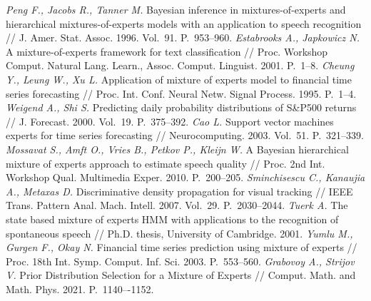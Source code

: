 \documentclass[12pt]{a&t}
\begin{document}
\begin{thebibliography}{}
	\textit{Peng F., Jacobs R., Tanner M.} Bayesian inference in mixtures-of-experts and hierarchical mixtures-of-experts models with an application to speech recognition // J. Amer. Stat. Assoc. 1996. Vol.~91. P.~953--960.
	\textit{Estabrooks A., Japkowicz N.} A mixture-of-experts framework for text classification // Proc. Workshop Comput. Natural Lang. Learn., Assoc. Comput. Linguist. 2001. P.~1--8.
	\textit{Cheung Y., Leung W., Xu L.} Application of mixture of experts model to financial time series forecasting // Proc. Int. Conf. Neural Netw. Signal Process. 1995. P.~1--4.
	\textit{Weigend A., Shi S.} Predicting daily probability distributions of S\&P500 returns // J. Forecast. 2000. Vol.~19. P.~375--392.
	\textit{Cao L.} Support vector machines experts for time series forecasting // Neurocomputing. 2003. Vol.~51. P.~321--339.
	\textit{Mossavat S., Amft O., Vries B., Petkov P., Kleijn W.} A Bayesian hierarchical mixture of experts approach to estimate speech quality // Proc. 2nd Int. Workshop Qual. Multimedia Exper. 2010. P.~200--205.
	\textit{Sminchisescu C., Kanaujia A., Metaxas D.} Discriminative density propagation for visual tracking // IEEE Trans. Pattern Anal. Mach. Intell. 2007. Vol.~29. P.~2030--2044.
	\textit{Tuerk A.} The state based mixture of experts HMM with applications to the recognition of spontaneous speech // Ph.D. thesis, University of Cambridge. 2001.
	\textit{Yumlu M., Gurgen F.,  Okay N.} Financial time series prediction using mixture of experts // Proc. 18th Int. Symp. Comput. Inf. Sci. 2003. P.~553--560.
	\textit{Grabovoy A., Strijov V.} Prior Distribution Selection for a Mixture of Experts // Comput. Math. and Math. Phys. 2021. P.~1140–-1152.
\end{thebibliography}
\end{document}
